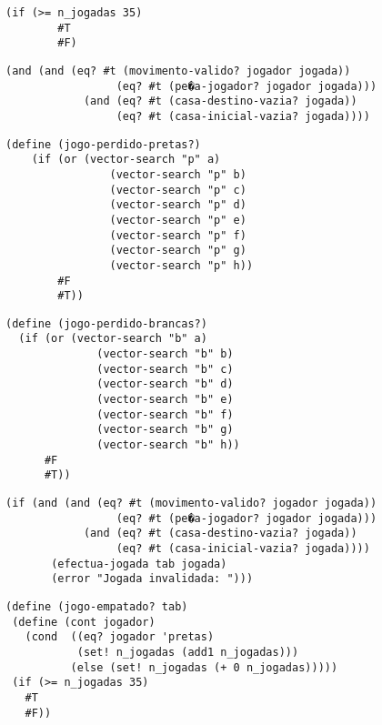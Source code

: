 \begin{lstlisting}[basicstyle=\ttfamily, caption="example"]
  (if (>= n_jogadas 35)
        #T
        #F)
\end{lstlisting}

\begin{lstlisting}[basicstyle=\ttfamily, caption="example"]
(and (and (eq? #t (movimento-valido? jogador jogada))
                 (eq? #t (pe�a-jogador? jogador jogada)))
            (and (eq? #t (casa-destino-vazia? jogada))
                 (eq? #t (casa-inicial-vazia? jogada))))
\end{lstlisting}
\begin{lstlisting}[basicstyle=\ttfamily, caption="example"]
(define (jogo-perdido-pretas?)
    (if (or (vector-search "p" a)
                (vector-search "p" b)
                (vector-search "p" c)
                (vector-search "p" d)
                (vector-search "p" e)
                (vector-search "p" f)
                (vector-search "p" g)
                (vector-search "p" h))
        #F
        #T))
\end{lstlisting}
\begin{lstlisting}[basicstyle=\ttfamily, caption="example"]
(define (jogo-perdido-brancas?)
  (if (or (vector-search "b" a)
              (vector-search "b" b)
              (vector-search "b" c)
              (vector-search "b" d)
              (vector-search "b" e)
              (vector-search "b" f)
              (vector-search "b" g)
              (vector-search "b" h))
      #F
      #T))
\end{lstlisting}
\begin{lstlisting}[basicstyle=\ttfamily, caption="example"]
(if (and (and (eq? #t (movimento-valido? jogador jogada))
                 (eq? #t (pe�a-jogador? jogador jogada)))
            (and (eq? #t (casa-destino-vazia? jogada))
                 (eq? #t (casa-inicial-vazia? jogada))))
       (efectua-jogada tab jogada)
       (error "Jogada invalidada: ")))
\end{lstlisting}
\begin{lstlisting}[basicstyle=\ttfamily, caption="example"]
(define (jogo-empatado? tab)
 (define (cont jogador)
   (cond  ((eq? jogador 'pretas)
           (set! n_jogadas (add1 n_jogadas)))
          (else (set! n_jogadas (+ 0 n_jogadas)))))
 (if (>= n_jogadas 35)
   #T
   #F))
\end{lstlisting}
